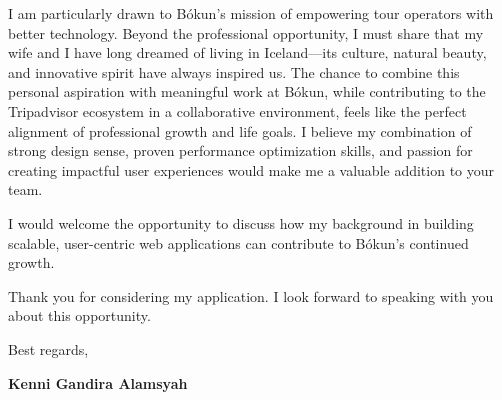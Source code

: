 \documentclass[11pt]{article}
\begin{document}
I am particularly drawn to Bókun's mission of empowering tour operators with better technology. Beyond the professional opportunity, I must share that my wife and I have long dreamed of living in Iceland—its culture, natural beauty, and innovative spirit have always inspired us. The chance to combine this personal aspiration with meaningful work at Bókun, while contributing to the Tripadvisor ecosystem in a collaborative environment, feels like the perfect alignment of professional growth and life goals. I believe my combination of strong design sense, proven performance optimization skills, and passion for creating impactful user experiences would make me a valuable addition to your team.

I would welcome the opportunity to discuss how my background in building scalable, user-centric web applications can contribute to Bókun's continued growth.

Thank you for considering my application. I look forward to speaking with you about this opportunity.

\vspace{1em}

Best regards,

\textbf{Kenni Gandira Alamsyah}
\end{document}
